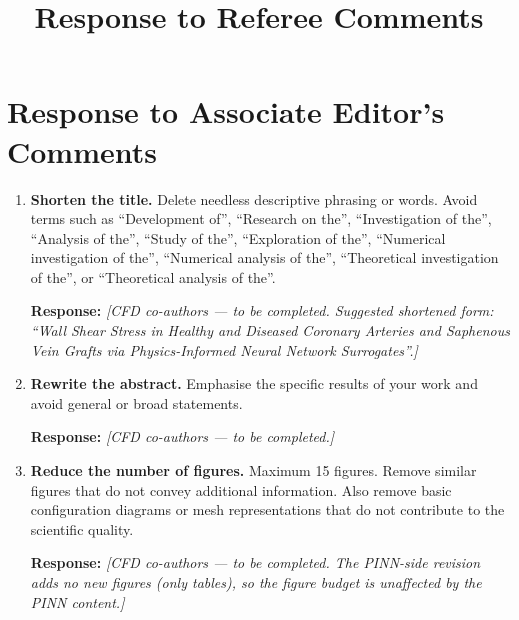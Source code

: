 \documentclass[11pt]{article}
\title{Response to Referee Comments}
\author{}
\date{}
\begin{document}
\maketitle



\section*{Response to Associate Editor’s Comments}

\begin{enumerate}[label=\textbf{\arabic*.}, leftmargin=*]

\item \textbf{Shorten the title.}
  Delete needless descriptive phrasing or words. Avoid terms such as “Development of”, “Research on the”, “Investigation of the”, “Analysis of the”, “Study of the”, “Exploration of the”, “Numerical investigation of the”, “Numerical analysis of the”, “Theoretical investigation of the”, or “Theoretical analysis of the”.

  \textbf{Response:} \textit{[CFD co-authors --- to be completed. Suggested shortened form: ``Wall Shear Stress in Healthy and Diseased Coronary Arteries and Saphenous Vein Grafts via Physics-Informed Neural Network Surrogates''.]}
  \vspace{0.5cm}

\item \textbf{Rewrite the abstract.}
  Emphasise the specific results of your work and avoid general or broad statements.

  \textbf{Response:} \textit{[CFD co-authors --- to be completed.]}
  \vspace{0.5cm}

\item \textbf{Reduce the number of figures.}
  Maximum 15 figures. Remove similar figures that do not convey additional information. Also remove basic configuration diagrams or mesh representations that do not contribute to the scientific quality.

  \textbf{Response:} \textit{[CFD co-authors --- to be completed. The PINN-side revision adds no new figures (only tables), so the figure budget is unaffected by the PINN content.]}
  \vspace{0.5cm}


\end{enumerate}
\end{document}
